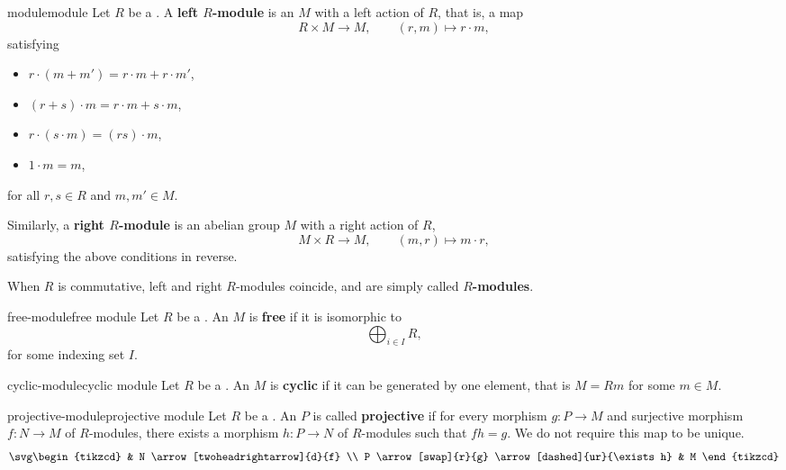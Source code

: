 \begin{topic}{module}{module}
    Let $R$ be a . A \textbf{left $R$-module} is an  $M$ with a left action of $R$, that is, a map
    \[ R \times M \to M, \qquad (r, m) \mapsto r \cdot m, \]
    satisfying
    \begin{itemize}
        \item $r \cdot (m + m') = r \cdot m + r \cdot m'$,
        \item $(r + s) \cdot m = r \cdot m + s \cdot m$,
        \item $r \cdot (s \cdot m) = (rs) \cdot m$,
        \item $1 \cdot m = m$,
    \end{itemize}
    for all $r, s \in R$ and $m, m' \in M$.
    
    Similarly, a \textbf{right $R$-module} is an abelian group $M$ with a right action of $R$,
    \[ M \times R \to M, \qquad (m, r) \mapsto m \cdot r , \]
    satisfying the above conditions in reverse.
    
    When $R$ is commutative, left and right $R$-modules coincide, and are simply called \textbf{$R$-modules}.
\end{topic}

\begin{topic}{free-module}{free module}
    Let $R$ be a . An  $M$ is \textbf{free} if it is isomorphic to
    \[ \bigoplus_{i \in I} R , \]
    for some indexing set $I$.
\end{topic}

\begin{topic}{cyclic-module}{cyclic module}
    Let $R$ be a . An  $M$ is \textbf{cyclic} if it can be generated by one element, that is $M = Rm$ for some $m \in M$.
\end{topic}

\begin{topic}{projective-module}{projective module}
    Let $R$ be a . An  $P$ is called \textbf{projective} if for every morphism $g : P \to M$ and surjective morphism $f : N \to M$ of $R$-modules, there exists a morphism $h : P \to N$ of $R$-modules such that $fh = g$. We do not require this map to be unique.
    \[ \svg \begin{tikzcd} & N \arrow[twoheadrightarrow]{d}{f} \\ P \arrow[swap]{r}{g} \arrow[dashed]{ur}{\exists h} & M \end{tikzcd} \]
\end{topic}

